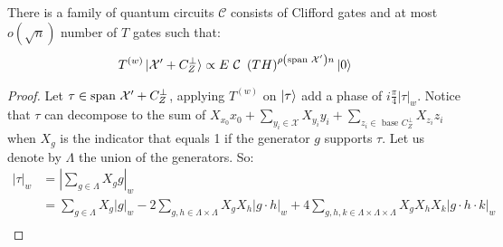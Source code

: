 \documentclass[manuscript,screen,review]{acmart}
\begin{document}
\begin{claim}
  There is a family of quantum circuits $\mathcal{C}$ consists of Clifford gates and at most $o(\sqrt{n})$ number of $T$ gates such that: 
  \begin{equation*}
    \begin{split}
      T^{(w)}\ket{\Mbas + C_{Z}^{\perp}} \propto E \ \mathcal{C} \ \left(TH\right)^{\rho\left(\sMbas\right)n} \ket{0} 
    \end{split}
  \end{equation*}
\end{claim}
\begin{proof}
  Let $\tau \in \text{span }\mathcal{X}^\prime + C_{Z}^\perp$, applying $T^{(w)}$ on $\ket{\tau}$ add a phase of $i\frac{\pi}{4}\left|\tau\right|_{w}$. Notice that $\tau$ can decompose to the sum of  $X_{x_{0}}x_{0} + \sum_{y_{i} \in \mathcal{X}}{X_{y_{i}}y_{i}} + \sum_{z_{i} \in \text{ base }C_{Z}^{\perp}}{X_{z_{i}}z_{i}}$ when $X_{g}$ is the indicator that equals 1 if the generator $g$ supports $\tau$. Let us denote by $\Lambda$ the union of the generators. So:
  \begin{equation*}
    \begin{split}
      \left|\tau\right|_{w} &= \left| \sum_{g \in \Lambda}{ X_{g}g }\right|_{w} \\
      &= \sum_{g\in \Lambda}{X_{g}|g|_{w}} - 2\sum_{g,h\in \Lambda \times \Lambda}{X_{g}X_{h}|g \cdot h |_{w}}+ 4\sum_{g, h, k\in \Lambda \times \Lambda \times \Lambda }{X_{g}X_{h}X_{k}|g \cdot h \cdot k |_{w}}  \\
    \end{split}
  \end{equation*}
  

\end{proof}
\end{document}
